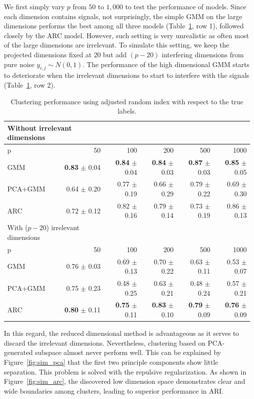 \documentclass[12pt]{article}
\begin{document}
We first simply vary $p$ from $50$ to $1,000$ to test the performance of models. Since each dimension contains signals, not surprisingly, the simple GMM on the large dimensions performs the best among all three models (Table~\ref{tabs1}, row 1), followed closely by the ARC model. However, such setting is very unrealistic as often most of the large dimensions are irrelevant. To simulate this setting, we keep the projected dimensions fixed at $20$ but add $(p-20)$ interfering dimensions from pure noise $y_{i,j}\sim N(0,1)$. The performance of the high dimensional GMM starts to deteriorate when the irrelevant dimensions to start to interfere with the signals (Table~\ref{tabs1}, row 2).


\begin{table}[H]
\small
\centering
	\begin{tabular}{| l | r | r| r| r| r| }
			\multicolumn{2}{l}{Without irrelevant dimensions} \\
	\hline
			p & 50 & 100 & 200 & 500 &1000  \\
	\hline
			GMM &   {\bf 0.83} $\pm$ 0.04 &  {\bf 0.84} $\pm$ 0.04  &  {\bf 0.84} $\pm$ 0.03 &  {\bf 0.87} $\pm$ 0.03 &  {\bf 0.85} $\pm$ 0.05 \\
			PCA+GMM		& 0.64 $\pm$ 0.20 & 0.77 $\pm$ 0.19 & 0.66 $\pm$ 0.29 & 0.79 $\pm$ 0.22 & 0.69 $\pm$ 0.30\\
			ARC 	&  0.72 $\pm$ 0.12 & 0.82 $\pm$ 0.16 & 0.79 $\pm$ 0.14 & 0.73 $\pm$ 0.19 & 0.86 $\pm$ 0.13\\
			\hline
			\multicolumn{2}{l}{With ($p-20$) irrelevant dimensions } \\
	\hline
			p & 50 & 100 & 200 & 500 &1000  \\
	\hline
			GMM & 0.76 $\pm$ 0.03  &  0.69 $\pm$ 0.13     &  0.70 $\pm$ 0.22  &  0.63 $\pm$ 0.11 &  0.53 $\pm$ 0.07\\
			PCA+GMM	&0.75 $\pm$ 0.23 	& 0.48 $\pm$ 0.25  &  0.63 $\pm$ 0.21   &  0.48 $\pm$ 0.24&   0.57 $\pm$ 0.21\\
			ARC 	& {\bf 0.80} $\pm$ 0.11  & {\bf 0.75} $\pm$ 0.11 &  {\bf 0.83 } $\pm$ 0.10   &  {\bf 0.79} $\pm$ 0.09&  {\bf 0.76} $\pm$ 0.09\\
			\hline
	\end{tabular}
	\caption{Clustering performance using adjusted random index with respect to the true labels.}
	\label{tabs1}
\end{table}

In this regard, the reduced dimensional method is advantageous as it serves to discard the irrelevant dimensions. Nevertheless, clustering based on PCA-generated subspace almost never perform well. This can be explained by Figure~\ref{fig:sim_pca} that the first two principle components show little separation. This problem is solved with the repulsive regularization. As shown in  Figure~\ref{fig:sim_arc}, the discovered low dimension space demonstrates clear and wide boundaries among clusters, leading to superior performance in ARI. 
\end{document}

